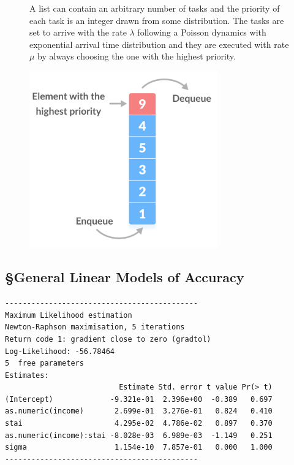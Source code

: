 \begin{figure}

\begin{minipage}[t]{0.50\linewidth}

{\centering 

A list can contain an arbitrary number of tasks and the priority of each
task is an integer drawn from some distribution. The tasks are set to
arrive with the rate \(\lambda\) following a Poisson dynamics with
exponential arrival time distribution and they are executed with rate
\(\mu\) by always choosing the one with the highest priority.

}

\end{minipage}%

\caption{\label{fig-prioq}\includegraphics[width=3.2in,height=\textheight]{images/prioq-illustration.png}}

\end{figure}

\hypertarget{general-linear-models-of-accuracy}{%
\subsection{§General Linear Models of
Accuracy}\label{general-linear-models-of-accuracy}}

\begin{verbatim}
--------------------------------------------
Maximum Likelihood estimation
Newton-Raphson maximisation, 5 iterations
Return code 1: gradient close to zero (gradtol)
Log-Likelihood: -56.78464 
5  free parameters
Estimates:
                          Estimate Std. error t value Pr(> t)
(Intercept)             -9.321e-01  2.396e+00  -0.389   0.697
as.numeric(income)       2.699e-01  3.276e-01   0.824   0.410
stai                     4.295e-02  4.786e-02   0.897   0.370
as.numeric(income):stai -8.028e-03  6.989e-03  -1.149   0.251
sigma                    1.154e-10  7.857e-01   0.000   1.000
--------------------------------------------
\end{verbatim}

